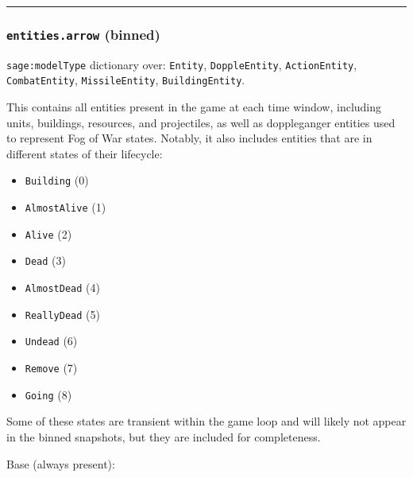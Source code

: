 \par\noindent\rule{\textwidth}{0.4pt}

\subsubsection*{\texttt{entities.arrow} (binned)}

\texttt{sage:modelType} dictionary over:
\texttt{Entity}, \texttt{DoppleEntity}, \texttt{ActionEntity}, \texttt{CombatEntity}, \texttt{MissileEntity}, \texttt{BuildingEntity}.

This contains all entities present in the game at each time window, including units, buildings, resources, and projectiles, as well as doppleganger entities used to represent Fog of War states. Notably, it also includes entities that are in different states of their lifecycle:

\begin{itemize}
  \item \texttt{Building} (0)
  \item \texttt{AlmostAlive} (1)
  \item \texttt{Alive} (2)
  \item \texttt{Dead} (3)
  \item \texttt{AlmostDead} (4)
  \item \texttt{ReallyDead} (5)
  \item \texttt{Undead} (6)
  \item \texttt{Remove} (7)
  \item \texttt{Going} (8)
\end{itemize}

Some of these states are transient within the game loop and will likely not appear in the binned snapshots, but they are included for completeness.

Base (always present):

